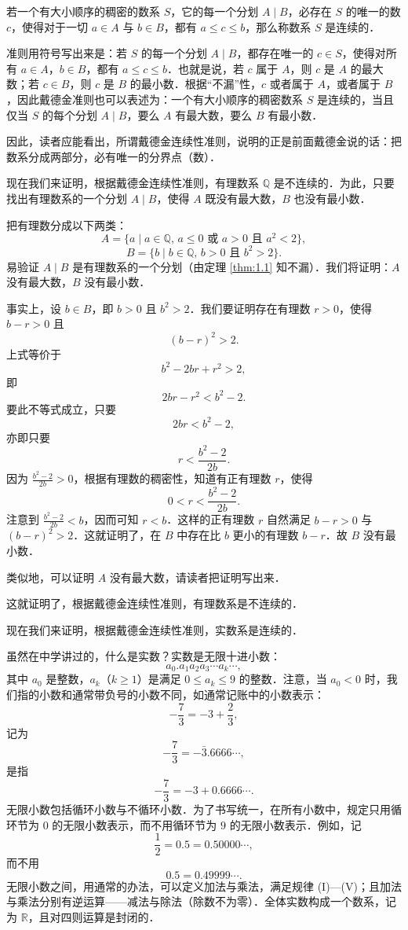 \begin{definition}[戴德金连续性准则]
若一个有大小顺序的稠密的数系 $S$，它的每一个分划 $A\mid B$，必存在 $S$ 的唯一的数 $c$，使得对于一切 $a\in A$ 与 $b\in B$，都有 $a\leqslant c \leqslant b$，那么称数系 $S$ 是连续的．
\label{def:1.2}
\end{definition}

准则用符号写出来是：若 $S$ 的每一个分划 $A\mid B$，都存在唯一的 $c\in S$，使得对所有 $a\in A$，$b\in B$，都有 $a\leqslant c \leqslant b$．也就是说，若 $c$ 属于 $A$，则 $c$ 是 $A$ 的最大数；若 $c\in B$，则 $c$ 是 $B$ 的最小数．根据``不漏''性，$c$ 或者属于 $A$，或者属于 $B$，因此戴德金准则也可以表述为：一个有大小顺序的稠密数系 $S$ 是连续的，当且仅当 $S$ 的每个分划 $A\mid B$，要么 $A$ 有最大数，要么 $B$ 有最小数．

因此，读者应能看出，所谓戴德金连续性准则，说明的正是前面戴德金说的话：把数系分成两部分，必有唯一的分界点（数）．

现在我们来证明，根据戴德金连续性准则，有理数系 $\mathbb{Q}$ 是不连续的．为此，只要找出有理数系的一个分划 $A\mid B$，使得 $A$ 既没有最大数，$B$ 也没有最小数．

\begin{example}
把有理数分成以下两类：
\[
A=\{a\mid a\in\mathbb{Q},\, a\leqslant 0 \text{ 或 } a>0 \text{ 且 } a^2<2\},
\]
\[
B=\{b\mid b\in\mathbb{Q},\, b>0 \text{ 且 } b^2>2\}.
\]
易验证 $A\mid B$ 是有理数系的一个分划（由定理 \ref{thm:1.1} 知不漏）．我们将证明：$A$ 没有最大数，$B$ 没有最小数．

事实上，设 $b\in B$，即 $b>0$ 且 $b^2>2$．我们要证明存在有理数 $r>0$，使得 $b-r>0$ 且
\[
(b-r)^2>2.
\]
上式等价于
\[
b^2-2br+r^2>2,
\]
即
\[
2br-r^2<b^2-2.
\]
要此不等式成立，只要
\[
2br<b^2-2,
\]
亦即只要
\[
r<\frac{b^2-2}{2b}.
\]
因为 $\frac{b^2-2}{2b}>0$，根据有理数的稠密性，知道有正有理数 $r$，使得
\[
0<r<\frac{b^2-2}{2b}.
\]
注意到 $\frac{b^2-2}{2b}<b$，因而可知 $r<b$．这样的正有理数 $r$ 自然满足 $b-r>0$ 与 $(b-r)^2>2$．这就证明了，在 $B$ 中存在比 $b$ 更小的有理数 $b-r$．故 $B$ 没有最小数．

类似地，可以证明 $A$ 没有最大数，请读者把证明写出来．

这就证明了，根据戴德金连续性准则，有理数系是不连续的．
\end{example}

现在我们来证明，根据戴德金连续性准则，实数系是连续的．

虽然在中学讲过的，什么是实数？实数是无限十进小数：
\[
a_0.a_1a_2a_3\cdots a_k\cdots,
\]
其中 $a_0$ 是整数，$a_k$（$k\geqslant 1$）是满足 $0\leqslant a_k\leqslant 9$ 的整数．注意，当 $a_0<0$ 时，我们指的小数和通常带负号的小数不同，如通常记账中的小数表示：
\[
-\frac{7}{3}=-3+\frac{2}{3},
\]
记为
\[
-\frac{7}{3}=-\bar{3}.6666\cdots,
\]
是指
\[
-\frac{7}{3}=-3+0.6666\cdots.
\]
无限小数包括循环小数与不循环小数．为了书写统一，在所有小数中，规定只用循环节为 $0$ 的无限小数表示，而不用循环节为 $9$ 的无限小数表示．例如，记
\[
\frac{1}{2}=0.5=0.50000\cdots,
\]
而不用
\[
0.5=0.49999\cdots.
\]
无限小数之间，用通常的办法，可以定义加法与乘法，满足规律 (I)—(V)；且加法与乘法分别有逆运算——减法与除法（除数不为零）．全体实数构成一个数系，记为 $\mathbb{R}$，且对四则运算是封闭的．

